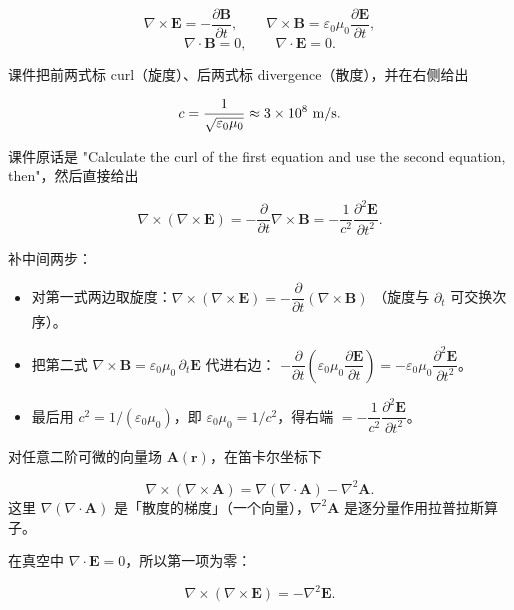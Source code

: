 \documentclass[11pt]{ctexart}
\newcommand{\unit}[1]{\ifmmode\mathrm{#1}\else$\mathrm{#1}$\fi}
\let\origsubhdr\subhdr
\renewcommand{\subhdr}[1]{\par\needspace{3\baselineskip}\origsubhdr{#1}}
\let\orighdr\hdr
\renewcommand{\hdr}[2]{\par\needspace{6\baselineskip}\orighdr{#1}{#2}}
\begin{document}


\[
\nabla\times\mathbf E=-\frac{\partial\mathbf B}{\partial t},
\qquad
\nabla\times\mathbf B=\varepsilon_0\mu_0\frac{\partial\mathbf E}{\partial t},
\]
\[
\nabla\cdot\mathbf B=0,
\qquad
\nabla\cdot\mathbf E=0 .
\]

课件把前两式标 curl（旋度）、后两式标 divergence（散度），并在右侧给出

\[
c=\frac{1}{\sqrt{\varepsilon_0\mu_0}}\approx3\times10^{8}\ \unit{m/s}.
\]


课件原话是 "Calculate the curl of the first equation and use the second equation, then"，然后直接给出

\[
\nabla\times(\nabla\times\mathbf E)=-\frac{\partial}{\partial t}\nabla\times\mathbf B=-\frac{1}{c^2}\frac{\partial^2\mathbf E}{\partial t^2}.
\]

补中间两步：

\begin{itemize}
\item 对第一式两边取旋度：$\nabla\times(\nabla\times\mathbf E)=-\dfrac{\partial}{\partial t}(\nabla\times\mathbf B)$
      （旋度与 $\partial_t$ 可交换次序）。
\item 把第二式 $\nabla\times\mathbf B=\varepsilon_0\mu_0\,\partial_t\mathbf E$ 代进右边：
      $-\dfrac{\partial}{\partial t}\left(\varepsilon_0\mu_0\dfrac{\partial\mathbf E}{\partial t}\right)
      =-\varepsilon_0\mu_0\dfrac{\partial^2\mathbf E}{\partial t^2}$。
\item 最后用 $c^2=1/(\varepsilon_0\mu_0)$，即 $\varepsilon_0\mu_0=1/c^2$，得右端 $=-\dfrac{1}{c^2}\dfrac{\partial^2\mathbf E}{\partial t^2}$。
\end{itemize}


对任意二阶可微的向量场 $\mathbf A(\mathbf r)$，在笛卡尔坐标下

\[
\nabla\times(\nabla\times\mathbf A)=\nabla(\nabla\cdot\mathbf A)-\nabla^2\mathbf A .
\]
这里 $\nabla(\nabla\cdot\mathbf A)$ 是「散度的梯度」（一个向量），$\nabla^2\mathbf A$ 是逐分量作用拉普拉斯算子。

在真空中 $\nabla\cdot\mathbf E=0$，所以第一项为零：

\[
\nabla\times(\nabla\times\mathbf E)=-\nabla^2\mathbf E .
\]
\end{document}
